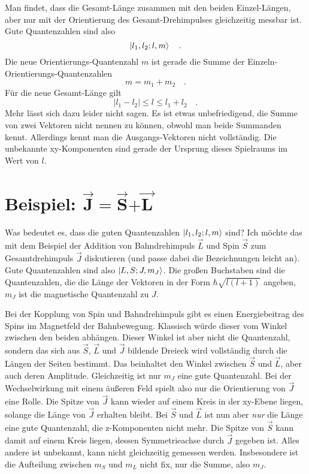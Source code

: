 Man findet, dass die Gesamt-Länge zusammen mit den beiden Einzel-Längen, aber nur mit der Orientierung des Gesamt-Drehimpulses gleichzeitig messbar ist. Gute Quantenzahlen sind also 
\begin{equation}
\ket{l_1, l_2; l , m }  \quad .
\end{equation} 
Die neue Orientierungs-Quantenzahl $m$ ist gerade die Summe der Einzeln-Orientierungs-Quantenzahlen
\begin{equation}
 m  = m_1 + m_2  \quad .
\end{equation}
Für die  neue Gesamt-Länge gilt
\begin{equation}
 | l_1 - l_2 | \le l \le l_1 + l_2  \quad .
\end{equation}
Mehr lässt sich dazu leider nicht sagen. Es ist etwas unbefriedigend, die Summe von zwei Vektoren nicht nennen zu können, obwohl man beide Summanden kennt. Allerdings kennt man die Ausgangs-Vektoren nicht vollständig. Die unbekannte xy-Komponenten sind gerade der Ursprung dieses Spielraums im Wert von $l$.


\section*{Beispiel: $\vec{\mathbf{J}} \mathbf{=} \vec{\mathbf{S}} \mathbf{+}  \vec{\mathbf{L}} $}

Was bedeutet es, dass die guten Quantenzahlen $\ket{l_1, l_2; l , m }$ sind? Ich möchte das mit dem  Beispiel der Addition von Bahndrehimpuls $\vec{L}$ und Spin $\vec{S}$ zum Gesamtdrehimpuls $\vec{J}$ diskutieren (und passe dabei die Bezeichnungen leicht an). Gute Quantenzahlen sind also $\ket{L, S; J , m_J }$. Die großen Buchstaben sind die Quantenzahlen, die die Länge der Vektoren in der Form $\hbar \sqrt{l (l+1)}$ angeben, $m_J$ ist die magnetische Quantenzahl zu $J$.


Bei der Kopplung von Spin und Bahndrehimpuls gibt es einen Energiebeitrag des Spins im Magnetfeld der Bahnbewegung. Klassisch würde dieser vom Winkel zwischen den beiden abhängen. Dieser Winkel ist aber nicht die Quantenzahl, sondern das sich aus $\vec{S}$, $\vec{L}$ und $\vec{J}$ bildende Dreieck wird vollständig durch die Längen der Seiten bestimmt. Das beinhaltet den Winkel zwischen $\vec{S}$ und $\vec{L}$, aber auch deren Amplitude. Gleichzeitig ist nur $m_J$ eine gute Quantenzahl. Bei der Wechselwirkung mit einem äußeren Feld spielt also nur die Orientierung von $\vec{J}$ eine Rolle. Die Spitze von $\vec{J}$ kann wieder auf einem Kreis in der xy-Ebene liegen, solange die Länge von $\vec{J}$ erhalten bleibt. Bei $\vec{S}$ und $\vec{L}$ ist nun aber \emph{nur} die Länge eine gute Quantenzahl, die z-Komponenten nicht mehr. Die Spitze von $\vec{S}$ kann damit auf einem Kreis liegen, dessen Symmetrieachse durch $\vec{J}$ gegeben ist. Alles andere ist unbekannt, kann nicht gleichzeitig gemessen werden. Insbesondere ist die Aufteilung zwischen $m_S$ und $m_L$ nicht fix, nur die Summe, also $m_J$.

